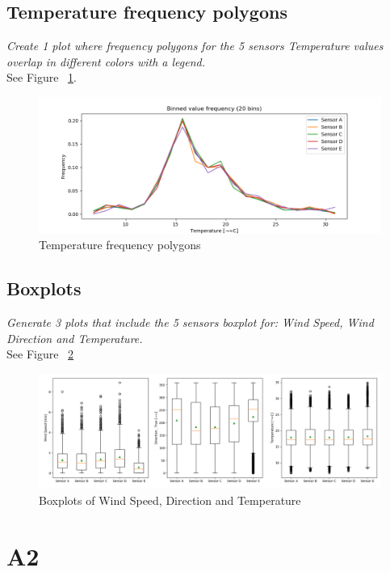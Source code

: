 \documentclass{article}
\begin{document}
\newpage

\subsection{Temperature frequency polygons}
\textit{
Create 1 plot where frequency polygons for the 5 sensors Temperature values overlap in different colors with a legend.
}\\

See Figure ~\ref{fig:1-3}.

\begin{figure}[!htb]
\centering
\includegraphics[width=\textwidth]{1-3-freq.png}
\caption{Temperature frequency polygons}
\label{fig:1-3}
\end{figure}

\subsection{Boxplots}
\textit{
Generate 3 plots that include the 5 sensors boxplot for: Wind Speed, Wind Direction and Temperature.
}\\

See Figure ~\ref{fig:1-4}

\begin{figure}[!htb]
\centering
\includegraphics[width=\textwidth]{1-4-box.png}
\caption{Boxplots of Wind Speed, Direction and Temperature}
\label{fig:1-4}
\end{figure}


\newpage

\section{A2}
\end{document}
